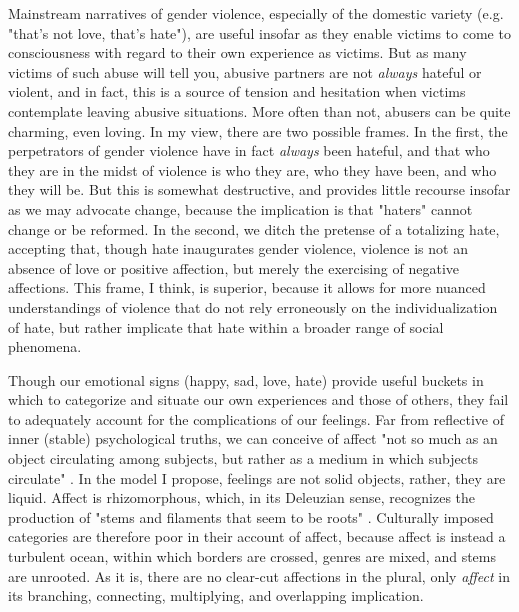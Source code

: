\documentclass[letterpaper,12pt]{turabian-researchpaper}
\begin{document}
Mainstream narratives of gender violence, especially of the domestic variety (e.g. "that's not love, that's hate"), are useful insofar as they enable victims to come to consciousness with regard to their own experience as victims. But as many victims of such abuse will tell you, abusive partners are not \textit{always} hateful or violent, and in fact, this is a source of tension and hesitation when victims contemplate leaving abusive situations. More often than not, abusers can be quite charming, even loving. In my view, there are two possible frames. In the first, the perpetrators of gender violence have in fact \textit{always} been hateful, and that who they are in the midst of violence is who they are, who they have been, and who they will be. But this is somewhat destructive, and provides little recourse insofar as we may advocate change, because the implication is that "haters" cannot change or be reformed. In the second, we ditch the pretense of a totalizing hate, accepting that, though hate inaugurates gender violence, violence is not an absence of love or positive affection, but merely the exercising of negative affections. This frame, I think, is superior, because it allows for more nuanced understandings of violence that do not rely erroneously on the individualization of hate, but rather implicate that hate within a broader range of social phenomena.

Though our emotional signs (happy, sad, love, hate) provide useful buckets in which to categorize and situate our own experiences and those of others, they fail to adequately account for the complications of our feelings. Far from reflective of inner (stable) psychological truths, we can conceive of affect "not so much as an object circulating among subjects, but rather as a medium in which subjects circulate" \autocite[59]{richard_economies_2009}. In the model I propose, feelings are not solid objects, rather, they are liquid. Affect is rhizomorphous, which, in its Deleuzian sense, recognizes the production of "stems and filaments that seem to be roots" \autocite[15]{deleuze_thousand_1987}. Culturally imposed categories are therefore poor in their account of affect, because affect is instead a turbulent ocean, within which borders are crossed, genres are mixed, and stems are unrooted. As it is, there are no clear-cut affections in the plural, only \textit{affect} in its branching, connecting, multiplying, and overlapping implication.


\newpage
\printbibliography
\end{document}
